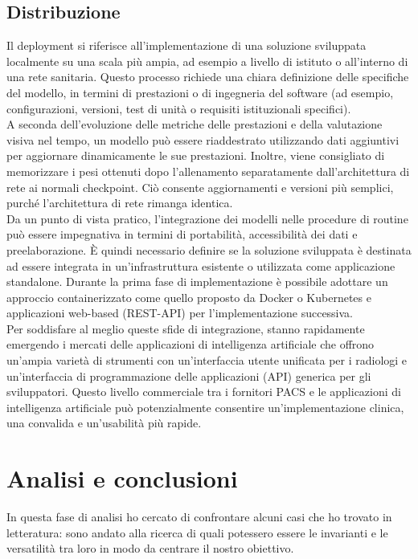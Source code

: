 \documentclass[12pt,a4paper]{report}
\begin{document}
\subsection{Distribuzione}
Il deployment si riferisce all'implementazione di una soluzione sviluppata localmente su una scala più ampia, ad esempio a livello di istituto o all'interno di una rete sanitaria. Questo processo richiede una chiara definizione delle specifiche del modello, in termini di prestazioni o di ingegneria del software (ad esempio, configurazioni, versioni, test di unità o requisiti istituzionali specifici).\\
A seconda dell'evoluzione delle metriche delle prestazioni e della valutazione visiva nel tempo, un modello può essere riaddestrato utilizzando dati aggiuntivi per aggiornare dinamicamente le sue prestazioni.
Inoltre, viene consigliato di memorizzare i pesi ottenuti dopo l'allenamento separatamente dall'architettura di rete ai normali checkpoint. Ciò consente aggiornamenti e versioni più semplici, purché l'architettura di rete rimanga identica.\\
Da un punto di vista pratico, l'integrazione dei modelli nelle procedure di routine può essere impegnativa in termini di portabilità, accessibilità dei dati e preelaborazione. È quindi necessario definire se la soluzione sviluppata è destinata ad essere integrata in un'infrastruttura esistente o utilizzata come applicazione standalone. Durante la prima fase di implementazione è possibile adottare un approccio containerizzato come quello proposto da Docker o Kubernetes e applicazioni web-based (REST-API) per l'implementazione successiva.\\
Per soddisfare al meglio queste sfide di integrazione, stanno rapidamente emergendo i mercati delle applicazioni di intelligenza artificiale che offrono un'ampia varietà di strumenti con un'interfaccia utente unificata per i radiologi e un'interfaccia di programmazione delle applicazioni (API) generica per gli sviluppatori. Questo livello commerciale tra i fornitori PACS e le applicazioni di intelligenza artificiale può potenzialmente consentire un'implementazione clinica, una convalida e un'usabilità più rapide.\cite{montagnon2020deep}

\section{Analisi e conclusioni}
In questa fase di analisi ho cercato di confrontare alcuni casi che ho trovato in letteratura: sono andato alla ricerca di quali potessero essere le invarianti e le versatilità tra loro in modo da centrare il nostro obiettivo.\\
\end{document}
